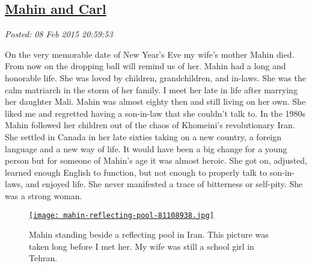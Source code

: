 %

\subsection*{\href{https://bakerjd99.wordpress.com/2015/02/08/mahin-and-carl/}{Mahin and Carl}}


\noindent\emph{Posted: 08 Feb 2015 20:59:53}
\vspace{6pt}

On the very memorable date of New Year's Eve my wife's mother Mahin
died. From now on the dropping ball will remind us of her. Mahin had a
long and honorable life. She was loved by children, grandchildren, and
in-laws. She was the calm matriarch in the storm of her family. I meet
her late in life after marrying her daughter Mali. Mahin was almost
eighty then and still living on her own. She liked me and regretted
having a son-in-law that she couldn't talk to. In the 1980s Mahin
followed her children out of the chaos of Khomeini's revolutionary Iran.
She settled in Canada in her late sixties taking on a new country, a
foreign language and a new way of life. It would have been a big change
for a young person but for someone of Mahin's age it was almost heroic.
She got on, adjusted, learned enough English to function, but not enough
to properly talk to son-in-laws, and enjoyed life. She never manifested
a trace of bitterness or self-pity. She was a strong woman.



\captionsetup[figure]{labelformat=empty}
\begin{SCfigure}
\centering
\href{https://bakerjd99.wordpress.com/2015/02/08/mahin-and-carl/attachment/4933/}{\texttt{[image: mahin-reflecting-pool-81108938.jpg]}}
\caption{Mahin standing beside a reflecting pool in Iran. This picture was taken
long before I met her. My wife was still a school girl in
Tehran.}
\label{fig:4930X0}
\end{SCfigure}



